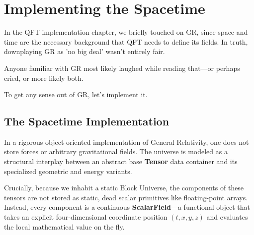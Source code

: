\chapter{Implementing the Spacetime}
\label{chap:implementing-gr}

In the QFT implementation chapter, we briefly touched on GR, since space and time are the necessary background that QFT needs to define its fields.
In truth, downplaying GR as 'no big deal' wasn't entirely fair.

Anyone familiar with GR most likely laughed while reading that—or perhaps cried, or more likely both.

To get any sense out of GR, let's implement it.


\section{The Spacetime Implementation}

In a rigorous object-oriented implementation of General Relativity, one does not store forces or arbitrary gravitational fields. 
The universe is modeled as a structural interplay between an abstract base \textbf{Tensor} data container and its specialized geometric and energy variants.

Crucially, because we inhabit a static Block Universe, the components of these tensors are not stored as static, dead scalar primitives like floating-point arrays. 
Instead, every component is a continuous \textbf{ScalarField}---a functional object that takes an explicit four-dimensional coordinate position $(t, x, y, z)$ and evaluates the local mathematical value on the fly.


